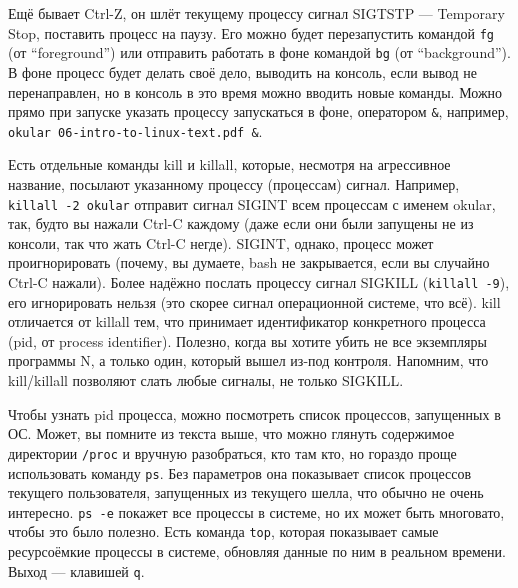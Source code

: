 \documentclass{../../text-style}
\begin{document}
Ещё бывает Ctrl-Z, он шлёт текущему процессу сигнал SIGTSTP --- Temporary Stop, поставить процесс на паузу.
Его можно будет перезапустить командой \verb|fg| (от \enquote{foreground}) или отправить работать в фоне командой \verb|bg| (от \enquote{background}).
В фоне процесс будет делать своё дело, выводить на консоль, если вывод не перенаправлен, но в консоль в это время можно вводить новые команды.
Можно прямо при запуске указать процессу запускаться в фоне, оператором \verb|&|, например, \verb|okular 06-intro-to-linux-text.pdf &|.

Есть отдельные команды kill и killall, которые, несмотря на агрессивное название, посылают указанному процессу (процессам) сигнал.
Например, \verb|killall -2 okular| отправит сигнал SIGINT всем процессам с именем okular, так, будто вы нажали Ctrl-C каждому (даже если они были запущены не из консоли, так что жать Ctrl-C негде).
SIGINT, однако, процесс может проигнорировать (почему, вы думаете, bash не закрывается, если вы случайно Ctrl-C нажали).
Более надёжно послать процессу сигнал SIGKILL (\verb|killall -9|), его игнорировать нельзя (это скорее сигнал операционной системе, что всё).
kill отличается от killall тем, что принимает идентификатор конкретного процесса (pid, от process identifier).
Полезно, когда вы хотите убить не все экземпляры программы N, а только один, который вышел из-под контроля.
Напомним, что kill/killall позволяют слать любые сигналы, не только SIGKILL.

Чтобы узнать pid процесса, можно посмотреть список процессов, запущенных в ОС.
Может, вы помните из текста выше, что можно глянуть содержимое директории \verb|/proc| и вручную разобраться, кто там кто, но гораздо проще использовать команду \verb|ps|.
Без параметров она показывает список процессов текущего пользователя, запущенных из текущего шелла, что обычно не очень интересно.
\verb|ps -e| покажет все процессы в системе, но их может быть многовато, чтобы это было полезно.
Есть команда \verb|top|, которая показывает самые ресурсоёмкие процессы в системе, обновляя данные по ним в реальном времени.
Выход --- клавишей \verb|q|.
\end{document}
